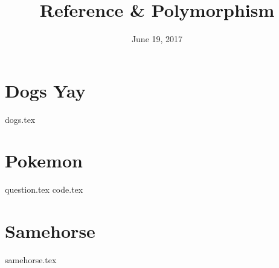 \documentclass{exam}
\title{Reference \& Polymorphism}
\date{June 19, 2017}
\begin{document}
\maketitle

\section{Dogs Yay}
\begin{questions}
{dogs.tex}
\end{questions}

\clearpage

\section{Pokemon}
\begin{questions}
{question.tex}
{code.tex}
\end{questions}

\clearpage

\section{Samehorse}
\begin{questions}
{samehorse.tex}
\end{questions}
\end{document}
